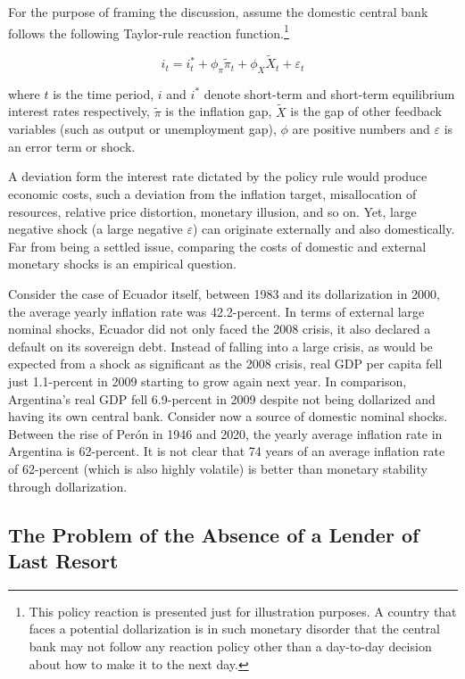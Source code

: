 \documentclass[12pt]{article}
\begin{document}
For the purpose of framing the discussion, assume the domestic central bank follows the following Taylor-rule reaction function.\footnote{This policy reaction is presented just for illustration purposes. A country that faces a potential dollarization is in such monetary disorder that the central bank may not follow any reaction policy other than a day-to-day decision about how to make it to the next day.}

\begin{equation} \label{Eq:1}
    i_t = i^*_t + \phi_\pi \tilde{\pi}_t + \phi_X \tilde{X}_t + \varepsilon_t
\end{equation}

where $t$ is the time period, $i$ and $i^*$ denote short-term and short-term equilibrium interest rates respectively, $\tilde{\pi}$ is the inflation gap, $\tilde{X}$ is the gap of other feedback variables (such as output or unemployment gap), $\phi$ are positive numbers and $\varepsilon$ is an error term or shock.

A deviation form the interest rate dictated by the policy rule would produce economic costs, such a deviation from the inflation target, misallocation of resources, relative price distortion, monetary illusion, and so on. Yet, large negative shock (a large negative $\varepsilon$) can originate externally and also domestically. Far from being a settled issue, comparing the costs of domestic and external monetary shocks is an empirical question.

Consider the case of Ecuador itself, between 1983 and its dollarization in 2000, the average yearly inflation rate was 42.2-percent. In terms of external large nominal shocks, Ecuador did not only faced the 2008 crisis, it also declared a default on its sovereign debt. Instead of falling into a large crisis, as would be expected from a shock as significant as the 2008 crisis, real GDP per capita fell just 1.1-percent in 2009 starting to grow again next year. In comparison, Argentina's real GDP fell 6.9-percent in 2009 despite not being dollarized and having its own central bank. Consider now a source of domestic nominal shocks. Between the rise of Perón in 1946 and 2020, the yearly average inflation rate in Argentina is 62-percent. It is not clear that 74 years of an average inflation rate of 62-percent (which is also highly volatile) is better than monetary stability through dollarization.


\subsection{The Problem of the Absence of a Lender of Last Resort}
\end{document}
